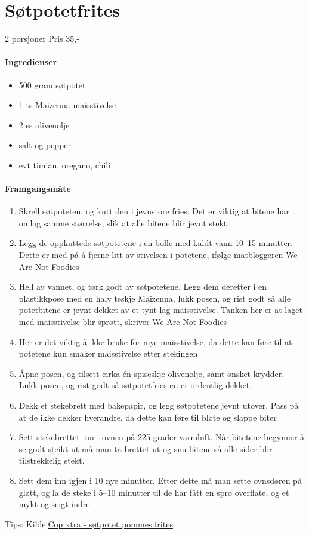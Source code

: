 \section{﻿Søtpotetfrites}
\label{frites}

2 porsjoner
Pris 35,-

\paragraph{Ingredienser}
\begin{itemize}[noitemsep]
	\item 500 gram søtpotet
	\item 1 ts Maizenna maisstivelse
	\item 2 ss olivenolje
	\item salt og pepper
	\item evt timian, oregano, chili
\end{itemize}

\paragraph{Framgangsmåte}
\begin{enumerate}[noitemsep]
	\item Skrell søtpoteten, og kutt den i jevnstore fries. Det er viktig at bitene har omlag samme størrelse, slik at alle bitene blir jevnt stekt.
	\item Legg de oppkuttede søtpotetene i en bolle med kaldt vann 10--15 minutter. Dette er med på å fjerne litt av stivelsen i potetene, ifølge matbloggeren We Are Not Foodies
	\item Hell av vannet, og tørk godt av søtpotetene. Legg dem deretter i en plastikkpose med en halv teskje Maizenna, lukk posen, og rist godt så alle potetbitene er jevnt dekket av et tynt lag maisstivelse. Tanken her er at laget med maisstivelse blir sprøtt, skriver We Are Not Foodies
	\item Her er det viktig å ikke bruke for mye maisstivelse, da dette kan føre til at potetene kun smaker maisstivelse etter stekingen
	\item Åpne posen, og tilsett cirka én spiseskje olivenolje, samt ønsket krydder. Lukk posen, og rist godt så søtpotetfries-en er ordentlig dekket.
	\item Dekk et stekebrett med bakepapir, og legg søtpotetene jevnt utover. Pass på at de ikke dekker hverandre, da dette kan føre til bløte og slappe biter
	\item Sett stekebrettet inn i ovnen på 225 grader varmluft. Når bitetene begynner å se godt steikt ut må man ta brettet ut og snu bitene så alle sider blir tilstrekkelig stekt.
	\item Sett dem inn igjen i 10 nye minutter. Etter dette må man sette ovnsdøren på gløtt, og la de steke i 5--10 minutter til de har fått en sprø overflate, og et mykt og seigt indre.

\end{enumerate}

Tips:
Kilde:\href{https://coop.no/extra/mat--trender/garantert-spro-sotpotetfries/}{Cop xtra - søtpotet pommes frites}
